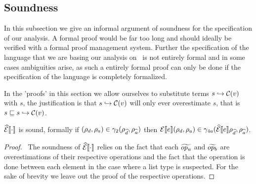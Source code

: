 \subsection{Soundness}\label{subsec:soundness}

In this subsection we give an informal argument of soundness for the specification of our analysis.
A formal proof would be far too long and should ideally be verified with a formal proof management system.
Further the specification of the language that we are basing our analysis on~\cite{halder_abstract_2012} is not entirely formal and in some cases ambiguities arise, as such a entirely formal proof can only be done if the specification of the language is completely formalized.

In the 'proofs' in this section we allow ourselves to substitute terms $s \hookrightarrow \mathcal{C}(v)$ with $s$, the justification is that $s \hookrightarrow \mathcal{C}(v)$ will only ever overestimate $s$, that is $s \sqsubseteq s \hookrightarrow \mathcal{C}(v)$.

\begin{conjecture}\label{thm:sound-exp}
    $\widehat{\mathcal{E}}\llbracket \cdot \rrbracket$ is sound, formally if $(\rho_d, \rho_a) \in \gamma_2(\rho_{\widehat{d}}, \rho_{\widehat{a}})$ then $\mathcal{E}\llbracket e \rrbracket(\rho_d, \rho_a) \in \gamma_{4a}(\widehat{\mathcal{E}}\llbracket e \rrbracket\rho_{\widehat{d}}, \rho_{\widehat{a}})$.
\end{conjecture}
\begin{proof}
    \pfsketch\
    The soundness of $\widehat{\mathcal{E}}\llbracket \cdot \rrbracket$ relies on the fact that each $\widetilde{op_u}$ and $\widetilde{op_b}$ are overestimations of their respective operations and the fact that the operation is done between each element in the case where a list type is suspected.
    For the sake of brevity we leave out the proof of the respective operations.
\end{proof}

